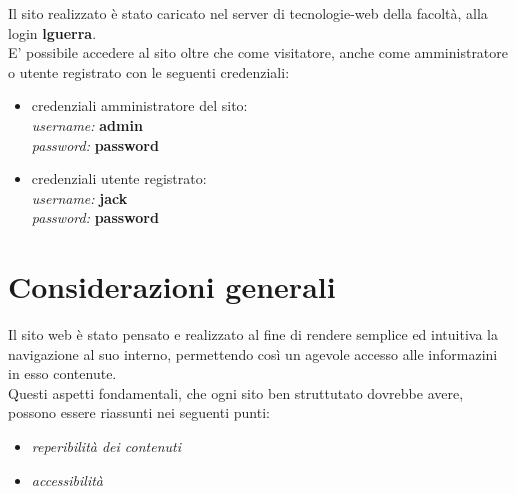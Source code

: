 \noindent Il sito realizzato è stato caricato nel server di tecnologie-web della facoltà, alla login \textbf{lguerra}.\\

\noindent E' possibile accedere al sito oltre che come visitatore, anche come amministratore o utente registrato con le seguenti credenziali:
\begin{itemize}


\item credenziali amministratore del sito:\\
\textit{username:} \textbf{admin}\\
\textit{password:} \textbf{password}
\item credenziali utente registrato:\\
\textit{username:} \textbf{jack}\\
\textit{password:} \textbf{password}\\
\end{itemize}


\section{Considerazioni generali}

Il sito web è stato pensato e realizzato al fine di rendere semplice ed intuitiva la navigazione al suo interno, permettendo così un agevole accesso alle informazini in esso contenute.\\
Questi aspetti fondamentali, che ogni sito ben struttutato dovrebbe avere, possono essere riassunti nei seguenti punti:
\begin{itemize}
\item \textit{reperibilità dei contenuti}
\item \textit{accessibilità}
\end{itemize}

